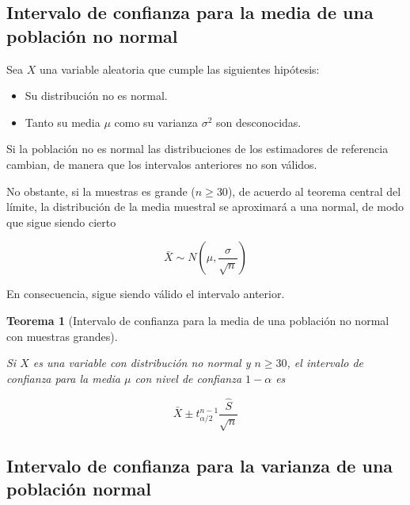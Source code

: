 \documentclass[
  a4paper,
]{scrreport}
\providecommand{\tightlist}{%
  \setlength{\itemsep}{0pt}\setlength{\parskip}{0pt}}\usepackage{longtable,booktabs,array}
\theoremstyle{plain}
\newtheorem{theorem}{Teorema}[chapter]
\theoremstyle{definition}
\theoremstyle{definition}
\theoremstyle{remark}
\begin{document}
\hypertarget{intervalo-de-confianza-para-la-media-de-una-poblaciuxf3n-no-normal}{%
\subsection{Intervalo de confianza para la media de una población no
normal}\label{intervalo-de-confianza-para-la-media-de-una-poblaciuxf3n-no-normal}}

Sea \(X\) una variable aleatoria que cumple las siguientes hipótesis:

\begin{itemize}
\tightlist
\item
  Su distribución no es normal.
\item
  Tanto su media \(\mu\) como su varianza \(\sigma^2\) son desconocidas.
\end{itemize}

Si la población no es normal las distribuciones de los estimadores de
referencia cambian, de manera que los intervalos anteriores no son
válidos.

No obstante, si la muestras es grande (\(n\geq 30\)), de acuerdo al
teorema central del límite, la distribución de la media muestral se
aproximará a una normal, de modo que sigue siendo cierto

\[
\bar X \sim N\left(\mu,\frac{\sigma}{\sqrt{n}}\right)
\]

En consecuencia, sigue siendo válido el intervalo anterior.

\begin{theorem}[Intervalo de confianza para la media de una población no
normal con muestras
grandes]\protect\hypertarget{thm-intervalo-confianza-media-no-normal}{}\label{thm-intervalo-confianza-media-no-normal}

Si \(X\) es una variable con distribución no normal y \(n\geq 30\), el
\emph{intervalo de confianza para la media} \(\mu\) con nivel de
confianza \(1-\alpha\) es

\[
\bar{X}\pm t^{n-1}_{\alpha/2}\frac{\hat{S}}{\sqrt{n}}
\]

\end{theorem}

\hypertarget{intervalo-de-confianza-para-la-varianza-de-una-poblaciuxf3n-normal}{%
\subsection{Intervalo de confianza para la varianza de una población
normal}\label{intervalo-de-confianza-para-la-varianza-de-una-poblaciuxf3n-normal}}
\end{document}

